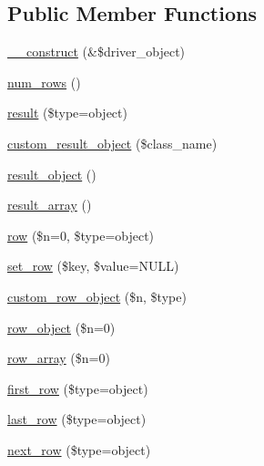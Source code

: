\subsection*{Public Member Functions}
\begin{DoxyCompactItemize}
\item 
\mbox{\hyperlink{class_c_i___d_b__result_a8e093c8b6e5733bc3f306385ee426ab7}{\+\_\+\+\_\+construct}} (\&\$driver\+\_\+object)
\item 
\mbox{\hyperlink{class_c_i___d_b__result_a218657c303ee499b97710ab0cd2f5d6e}{num\+\_\+rows}} ()
\item 
\mbox{\hyperlink{class_c_i___d_b__result_a86bc3a5f1694241cf86a6fd754553884}{result}} (\$type=\textquotesingle{}object\textquotesingle{})
\item 
\mbox{\hyperlink{class_c_i___d_b__result_a5ac3523f878efb629fae30a7d9156e77}{custom\+\_\+result\+\_\+object}} (\$class\+\_\+name)
\item 
\mbox{\hyperlink{class_c_i___d_b__result_a266a17f340dab35b8f2858931ff772a2}{result\+\_\+object}} ()
\item 
\mbox{\hyperlink{class_c_i___d_b__result_a444f7dd61bfbe3931a7188adad61feae}{result\+\_\+array}} ()
\item 
\mbox{\hyperlink{class_c_i___d_b__result_a43764449dacaf9b61bbd1efee9cdb256}{row}} (\$n=0, \$type=\textquotesingle{}object\textquotesingle{})
\item 
\mbox{\hyperlink{class_c_i___d_b__result_a77628e90fac65184ec9f583e7c30a48a}{set\+\_\+row}} (\$key, \$value=N\+U\+LL)
\item 
\mbox{\hyperlink{class_c_i___d_b__result_a223538c34395626655fd483f3a55e653}{custom\+\_\+row\+\_\+object}} (\$n, \$type)
\item 
\mbox{\hyperlink{class_c_i___d_b__result_a0bd3520c57f5cb192bdfaeed1f597c0a}{row\+\_\+object}} (\$n=0)
\item 
\mbox{\hyperlink{class_c_i___d_b__result_a8dbff471ffdaf617d49189f8636e4f81}{row\+\_\+array}} (\$n=0)
\item 
\mbox{\hyperlink{class_c_i___d_b__result_a9d7ddad4b02edf86c4f1ec27c0c8a2d7}{first\+\_\+row}} (\$type=\textquotesingle{}object\textquotesingle{})
\item 
\mbox{\hyperlink{class_c_i___d_b__result_a2c420342d5b577d91b6b993be86f68c0}{last\+\_\+row}} (\$type=\textquotesingle{}object\textquotesingle{})
\item 
\mbox{\hyperlink{class_c_i___d_b__result_a5664a519252b14c1cdd93d9de0322a9f}{next\+\_\+row}} (\$type=\textquotesingle{}object\textquotesingle{})

\end{DoxyCompactItemize}
